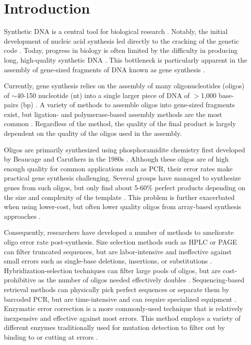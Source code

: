 \documentclass[twocolumn]{article}
\begin{document}
%
\section*{Introduction}
%

Synthetic DNA is a central tool for biological research \cite{hughes2017}. Notably, the initial development of nucleic acid synthesis led directly to the cracking of the genetic code \cite{nirenberg1964}. Today, progress in biology is often limited by the difficulty in producing long, high-quality synthetic DNA \cite{kosuri2014,boeke2016}. This bottleneck is particularly apparent in the assembly of gene-sized fragments of DNA known as gene synthesis \cite{ma2012dna2}.

Currently, gene synthesis relies on the assembly of many oligonucleotides (oligos) of $\sim$40-150 nucleotide (nt) into a single larger piece of DNA of $>$1,000 base-pairs (bp) \cite{ma2012dna2}. A variety of methods to assemble oligos into gene-sized fragments exist, but ligation- and polymerase-based assembly methods are the most common \cite{au1998,zhou2004,bang2008,gibson2009}. Regardless of the method, the quality of the final product is largely dependent on the quality of the oligos used in the assembly.

Oligos are primarily synthesized using phosphoramidite chemistry first developed by Beaucage and Caruthers in the 1980s \cite{beaucage1981}. Although these oligos are of high enough quality for common applications such as PCR, their error rates make practical gene synthesis challenging. Several groups have managed to synthesize genes from such oligos, but only find about 5-60\% perfect products depending on the size and complexity of the template \cite{carr2004,fuhrmann2005,currin2014,sequeira2016}. This problem is further exacerbated when using lower-cost, but often lower quality oligos from array-based synthesis approaches \cite{kosuri2010,tian2004,quan2011,kim2012,saaem2012,wan2014}.

Consequently, researchers have developed a number of methods to ameliorate oligo error rate post-synthesis. Size selection methods such as HPLC or PAGE can filter truncated sequences, but are labor-intensive and ineffective against small errors such as single-base deletions, insertions, or substitutions \cite{ellington2001,sinha2015}. Hybridization-selection techniques can filter large pools of oligos, but are cost-prohibitive as the number of oligos needed effectively doubles \cite{tian2004,borovkov2010}. Sequencing-based retrieval methods can physically pick perfect sequences or separate them by barcoded PCR, but are time-intensive and can require specialized equipment \cite{matzas2010,schwartz2012,lee2015}. Enzymatic error correction is a more commonly-used technique that is relatively inexpensive and effective against most errors. This method employs a variety of different enzymes traditionally used for mutation detection to filter out by binding to or cutting at errors \cite{mashal1995,youil1995,wagner1995,qiu2004mutation}.
\end{document}
